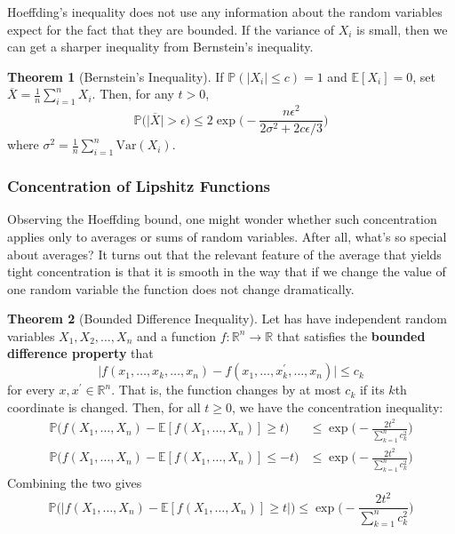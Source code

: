 \documentclass{article}
\theoremstyle{definition}
\newtheorem{theorem}{Theorem}[section]
\theoremstyle{remark}
\theoremstyle{definition}
\begin{document}
Hoeffding's inequality does not use any information about the random variables expect for the fact that they are bounded. If the variance of $X_i$ is small, then we can get a sharper inequality from Bernstein's inequality. 

\begin{theorem}[Bernstein's Inequality]
If $\mathbb{P}(|X_i| \leq c) = 1$ and $\mathbb{E}[X_i] = 0$, set $\overline{X} = \frac{1}{n} \sum_{i=1}^n X_i$. Then, for any $t > 0$, 
\[\mathbb{P} \big( \big| \overline{X} \big| > \epsilon \big) \leq 2 \exp \bigg( - \frac{n \epsilon^2}{2 \sigma^2 + 2 c \epsilon /3} \bigg)\]
where $\sigma^2 = \frac{1}{n} \sum_{i=1}^n \mathrm{Var}(X_i)$. 
\end{theorem}

\subsubsection{Concentration of Lipshitz Functions}

Observing the Hoeffding bound, one might wonder whether such concentration applies only to averages or sums of random variables. After all, what's so special about averages? It turns out that the relevant feature of the average that yields tight concentration is that it is smooth in the way that if we change the value of one random variable the function does not change dramatically. 

\begin{theorem}[Bounded Difference Inequality]
Let has have independent random variables $X_1, X_2, \ldots, X_n$ and a function $f: \mathbb{R}^n \longrightarrow \mathbb{R}$ that satisfies the \textbf{bounded difference property} that 
\[\big| f(x_1, \ldots, x_k, \ldots, x_n) - f(x_1, \ldots, x_k^\prime, \ldots, x_n) \big| \leq c_k\]
for every $x, x^\prime \in \mathbb{R}^n$. That is, the function changes by at most $c_k$ if its $k$th coordinate is changed. Then, for all $t \geq 0$, we have the concentration inequality: 
\begin{align*}
    \mathbb{P} \big( f(X_1, \ldots, X_n) - \mathbb{E}[ f(X_1, \ldots, X_n)] \geq t \big) & \leq \exp \bigg(- \frac{2t^2}{\sum_{k=1}^n c_k^2} \bigg) \\
    \mathbb{P} \big( f(X_1, \ldots, X_n) - \mathbb{E}[ f(X_1, \ldots, X_n)] \leq -t \big) & \leq \exp \bigg(- \frac{2t^2}{\sum_{k=1}^n c_k^2} \bigg)
\end{align*}
Combining the two gives 
\[\mathbb{P} \big( \big| f(X_1, \ldots, X_n) - \mathbb{E}[ f(X_1, \ldots, X_n)] \geq t \big| \big) \leq \exp \bigg(- \frac{2t^2}{\sum_{k=1}^n c_k^2} \bigg)\]
\end{theorem}
\end{document}
